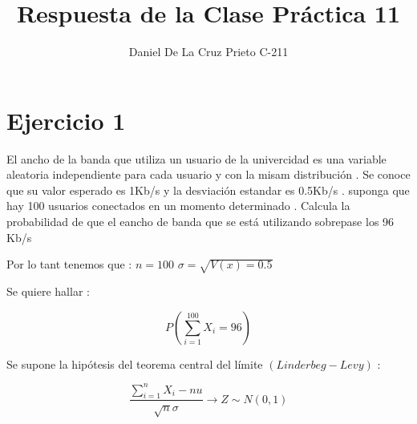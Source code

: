 \documentclass[10pt]{article}
\begin{document}
	\title{Respuesta de la Clase Pr\'actica 11}
	\author{Daniel De La Cruz Prieto C-211}
	\maketitle
	
	\section*{Ejercicio 1}
    \begin{flushleft}
    	El ancho de la banda que utiliza un usuario de la univercidad es una variable aleatoria independiente para cada usuario y con la misam distribuci\'on . Se conoce que su valor esperado es 1Kb/s y la desviaci\'on estandar es 0.5Kb/s . suponga que hay 100 usuarios conectados en un momento determinado . Calcula la probabilidad de que el eancho de banda que se est\'a utilizando sobrepase los 96 Kb/s
    \end{flushleft}
    
    \begin{flushleft}
     	Por lo tant	tenemos que : $ n = 100 $  \hspace{1cm} $ \sigma = \sqrt{V(x) = 0.5}$
    \end{flushleft}
    
    \begin{flushleft}
	    Se quiere hallar :
    \end{flushleft}
    
   	\begin{equation*}
   	    P \left(\sum_{i=1}^{100} X_{i} = 96\right)
   	\end{equation*}
   	
    \begin{flushleft}
   	   Se supone la hip\'otesis del teorema central del l\'imite $ \left(Linderbeg - Levy\right)$ :
    \end{flushleft}
   	
   	\begin{equation*}
   	   \displaystyle\frac{\sum_{i=1}^{n} X_i -nu}{\sqrt{n}\sigma} \longrightarrow Z\sim N (0,1)
   	\end{equation*}
   	
\end{document}
